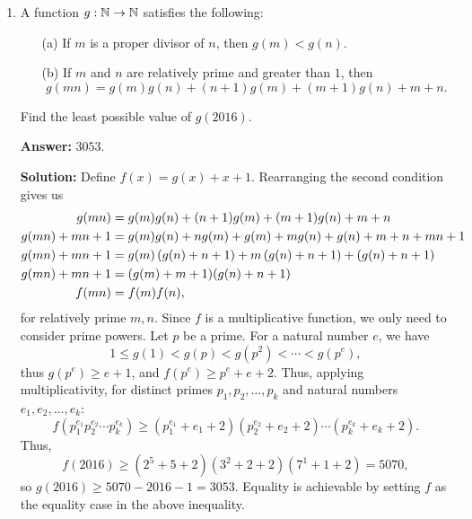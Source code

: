 \documentclass[11pt,paper=letter]{scrartcl}
\begin{document}
\begin{enumerate}[left=0pt]
\item A function $g : \mathbb N \rightarrow \mathbb N$ satisfies the following:

\begin{enumerate}

\item[(a)] If $m$ is a proper divisor of $n$, then $g(m) < g(n)$.

\item[(b)] If $m$ and $n$ are relatively prime and greater than $1$, then $$g(mn) = g(m)g(n) + (n+1)g(m) + (m+1)g(n) + m + n.$$

\end{enumerate}

Find the least possible value of $g(2016)$.

\textbf{Answer:} $\boxed{3053}$.

\textbf{Solution:} Define $f(x) = g(x) + x + 1$. Rearranging the second condition gives us
\begin{align*}
  g(mn) &= g(m)g(n) + (n+1)g(m) + (m+1)g(n) + m + n \\
  g(mn) + mn + 1 &= g(m)g(n) + ng(m) + g(m) + mg(n) + g(n) + m + n + mn + 1 \\
  g(mn) + mn + 1 &= g(m)\left( g(n) + n + 1 \right) + m\left( g(n) + n + 1 \right) + \left( g(n) + n + 1 \right) \\
  g(mn) + mn + 1 &= (g(m) + m + 1)(g(n) +n + 1)\\
  f(mn) &= f(m)f(n),
\end{align*}
for relatively prime $m, n$. Since $f$ is a multiplicative function, we only need to consider prime powers. Let $p$ be a prime. For a natural number $e$, we have $$1 \leq g(1) < g(p) < g(p^2) < \cdots < g(p^e),$$ thus $g(p^e) \geq e + 1$, and $f(p^e) \geq p^e + e + 2$. Thus, applying multiplicativity, for distinct primes $p_1, p_2, \ldots, p_k$ and natural numbers $e_1, e_2, \ldots, e_k$: $$f(p_1^{e_1}p_2^{e_2}\cdots p_k^{e_k}) \geq (p_1^{e_1} + e_1 + 2)(p_2^{e_2} + e_2 + 2)\cdots(p_k^{e_k} + e_k + 2).$$ Thus, $$f(2016) \geq (2^5 + 5 + 2)(3^2 + 2 + 2)(7^1 + 1 + 2) = 5070,$$ so $g(2016) \geq 5070 - 2016 - 1 = 3053$. Equality is achievable by setting $f$ as the equality case in the above inequality.
\end{enumerate}
\end{document}
